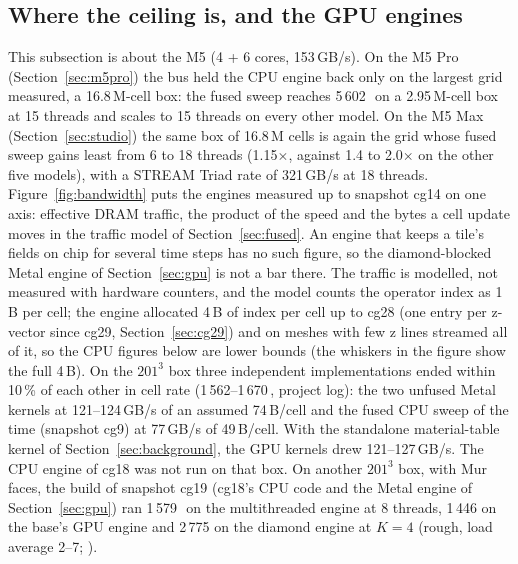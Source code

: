 \subsection{Where the ceiling is, and the GPU engines}\label{sec:ceiling}
This subsection is about the M5 (4 + 6 cores, 153\,GB/s). On the M5 Pro (Section~\ref{sec:m5pro}) the bus held the
CPU engine back only on the largest grid measured, a 16.8\,M-cell box: the fused sweep reaches 5\,602\,\MC\ on a
2.95\,M-cell box at 15 threads and scales to 15 threads on every other model. On the M5 Max (Section~\ref{sec:studio}) the same box
of 16.8\,M cells is again the grid whose fused sweep gains least from 6 to 18 threads (1.15$\times$, against 1.4 to 2.0$\times$ on the
other five models), with a STREAM Triad rate of 321\,GB/s at 18 threads.
Figure~\ref{fig:bandwidth} puts the engines measured up to snapshot cg14 on one axis: effective DRAM traffic, the
product of the speed and the bytes a cell update moves in the traffic model of Section~\ref{sec:fused}. An engine that
keeps a tile's fields on chip for several time steps has no such figure, so the diamond-blocked Metal engine of
Section~\ref{sec:gpu} is not a bar there. The traffic is
modelled, not measured with hardware counters, and the model counts the operator index as 1\,B per cell; the engine
allocated 4\,B of index per cell up to cg28 (one entry per z-vector since cg29, Section~\ref{sec:cg29}) and on meshes
with few z lines streamed all of it, so the CPU figures below are lower bounds (the whiskers in the figure show the
full 4\,B). On the $201^3$ box three independent implementations ended
within 10\,\% of each other in cell rate (1\,562--1\,670\,\MC, project log): the two unfused Metal kernels at
121--124\,GB/s of an assumed 74\,B/cell and the fused CPU sweep of the time (snapshot cg9) at 77\,GB/s of 49\,B/cell.
With the standalone material-table kernel of Section~\ref{sec:background}, the GPU kernels drew 121--127\,GB/s.
The CPU engine of cg18 was not run on that box. On another $201^3$ box, with Mur faces, the build of snapshot cg19
(cg18's CPU code and the Metal engine of Section~\ref{sec:gpu}) ran 1\,579\,\MC\ on the multithreaded engine at 8
threads, 1\,446 on the base's GPU engine and 2\,775 on the diamond engine at $K=4$ (rough, load average 2--7;
).

